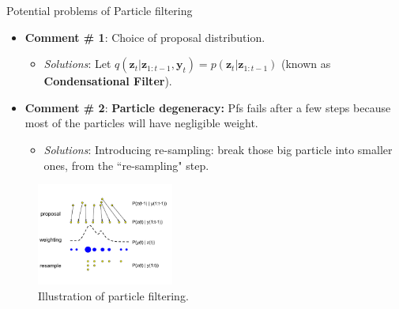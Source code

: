 \documentclass[10pt,mathserif]{beamer}
\begin{document}
\begin{frame}{Potential problems of Particle filtering}
\begin{itemize}\itemsep=12pt
    \item \textbf{Comment \# 1}:  Choice of proposal distribution.
    \begin{itemize} 
        \item \textit{Solutions}: Let $q(\bm{z}_t|\bm{z}_{1:t-1},\bm{y}_t) = p(\bm{z}_t|\bm{z}_{1:t-1}) $ (known as \textbf{Condensational Filter}). 
    \end{itemize}
    \item \textbf{Comment \# 2}:  \textbf{Particle degeneracy:} Pfs fails after a few steps because most of the particles will have negligible weight.
    \begin{itemize} 
        \item \textit{Solutions}: Introducing re-sampling: break those big particle into smaller ones, from the ``re-sampling" step.
    \end{itemize}
\end{itemize}
\begin{figure}[h]
\centering
\includegraphics[width=0.4\textwidth]{pf}
\caption{Illustration of particle filtering.}
\end{figure}
\end{frame}
\end{document}
